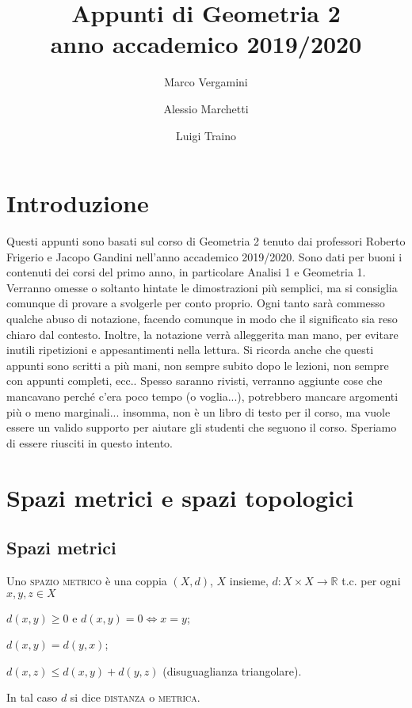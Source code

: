 \documentclass{article}
\title{Appunti di Geometria 2 \\ anno accademico 2019/2020}
\date{}
\author{Marco Vergamini \and Alessio Marchetti \and Luigi Traino}
\begin{document}
\maketitle
\newpage
\tableofcontents
\newpage

\section{Introduzione}
Questi appunti sono basati sul corso di Geometria 2 tenuto dai professori
Roberto Frigerio e Jacopo Gandini nell'anno accademico 2019/2020. Sono dati per
buoni i contenuti dei corsi del primo anno, in particolare Analisi 1 e Geometria
1. Verranno omesse o soltanto hintate le dimostrazioni più semplici, ma si
consiglia comunque di provare a svolgerle per conto proprio. Ogni tanto sarà
commesso qualche abuso di notazione, facendo comunque in modo che il significato
sia reso chiaro dal contesto. Inoltre, la notazione verrà alleggerita man mano,
per evitare inutili ripetizioni e appesantimenti nella lettura. Si ricorda anche che questi appunti sono scritti a più mani, non sempre subito dopo le lezioni, non sempre con appunti completi, ecc.. Spesso saranno rivisti, verranno aggiunte cose che mancavano perché c'era poco tempo (o voglia...), potrebbero mancare argomenti più o meno marginali... insomma, non è un libro di testo per il corso, ma vuole essere un valido supporto per aiutare gli studenti che seguono il corso. Speriamo di essere riusciti in questo intento.


\section{Spazi metrici e spazi topologici}
\subsection{Spazi metrici}
\begin{defn}
	Uno \textsc{spazio metrico} è una coppia $(X, d)$, $X$ insieme,
	${d: X \times X \rightarrow \mathbb{R}}$ t.c. per ogni ${x, y, z \in X}$
    \begin{nlist}
    	\item $d(x, y) \ge 0$ e $d(x, y)=0 \Leftrightarrow x=y$;
    	\item $d(x, y)=d(y, x)$;
    	\item $d(x, z) \le d(x, y)+d(y,z)$ (disuguaglianza triangolare).
    \end{nlist}
	In tal caso $d$ si dice \textsc{distanza} o \textsc{metrica}.
\end{defn}
\end{document}
